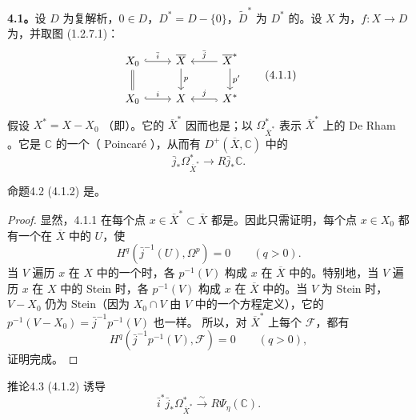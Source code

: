 \textbf{4.1。}设 $D$ 为复解析，$0\in D$，$D^*=D-\{0\}$，$\widetilde D^*$ 为 $D^*$ 的。设 $X$ 为，$f:X\to D$ 为，并取图 (1.2.7.1)：
\[
\begin{tikzcd}
 X_0\arrow[r,hook,"\bar i"]\arrow[d,equal]&\overline X\arrow[d,"p"]&\overline X^*\arrow[l,"\bar j"']\arrow[d,"p'"]\\
 X_0\arrow[r,hook,"i"]&X&X^*\arrow[l,hook,"j"']
\end{tikzcd}\tag{4.1.1}
\]
假设 $X^*=X-X_0$ （即）。它的 $\overline X^*$ 因而也是；以 $\Omega_{\overline X^*}^*$ 表示 $\overline X^*$ 上的 De Rham 。它是 $\mathbb C$ 的一个（ Poincaré ），从而有 $D^+(\overline X,\mathbb C)$ 中的
\[
 \bar j_*\Omega_{\overline X^*}^*\longrightarrow R\bar j_*\mathbb C.\tag{4.1.2}
\]

\begin{SGAresult}{命题}{4.2}
 (4.1.2) 是。
\end{SGAresult}
\begin{proof}
显然，4.1.1 在每个点 $x\in\overline X^*\subset\overline X$ 都是。因此只需证明，每个点 $x\in X_0$ 都有一个在 $\overline X$ 中的 $U$，使
\[
 H^q(\bar j^{-1}(U),\Omega^p)=0\qquad(q>0).
\]
当 $V$ 遍历 $x$ 在 $X$ 中的一个时，各 $p^{-1}(V)$ 构成 $x$ 在 $\overline X$ 中的。特别地，当 $V$ 遍历 $x$ 在 $X$ 中的 Stein 时，各 $p^{-1}(V)$ 构成 $x$ 在 $\overline X$ 中的。当 $V$ 为 Stein 时，$V-X_0$ 仍为 Stein（因为 $X_0\cap V$ 由 $V$ 中的一个方程定义），它的 $p^{-1}(V-X_0)=\bar j^{-1}p^{-1}(V)$ 也一样。
所以，对 $\overline X^*$ 上每个 $\mathscr F$，都有
\[
 H^q(\bar j^{-1}p^{-1}(V),\mathscr F)=0\qquad(q>0),
\]
证明完成。
\end{proof}

\begin{SGAresult}{推论}{4.3}
 (4.1.2) 诱导
\[
 \bar i^*\bar j_*\Omega_{\overline X^*}^*\xrightarrow{\sim}R\Psi_\eta(\mathbb C).\tag{4.3.1}
\]
\end{SGAresult}

